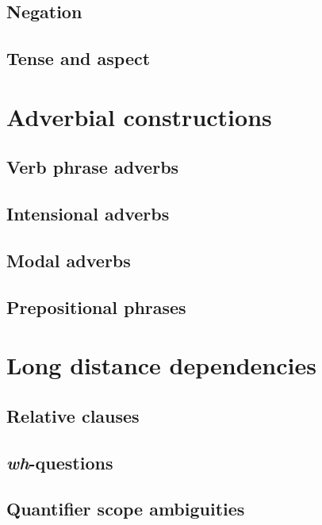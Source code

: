 \subsection{Negation}

\subsection{Tense and aspect}

\section{Adverbial constructions}

\subsection{Verb phrase adverbs}

\subsection{Intensional adverbs}

\subsection{Modal adverbs}

\subsection{Prepositional phrases}

\newpage

\section{Long distance dependencies}

\subsection{Relative clauses}

\subsection{\textit{wh}-questions}

\subsection{Quantifier scope ambiguities}

